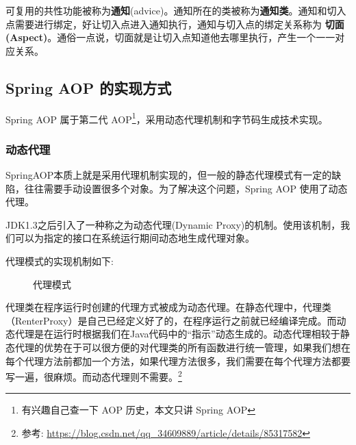 可复用的共性功能被称为\textbf{通知}(advice)。通知所在的类被称为\textbf{通知类}。通知和切入点需要进行绑定，好让切入点进入通知执行，通知与切入点的绑定关系称为 \textbf{切面(Aspect)}。通俗一点说，切面就是让切入点知道他去哪里执行，产生一个一一对应关系。

\subsection{Spring AOP 的实现方式}

Spring AOP 属于第二代 AOP\footnote{有兴趣自己查一下 AOP 历史，本文只讲 Spring AOP}，采用动态代理机制和字节码生成技术实现。

\subsubsection{动态代理}

SpringAOP本质上就是采用代理机制实现的，但一般的静态代理模式有一定的缺陷，往往需要手动设置很多个对象。为了解决这个问题，Spring AOP 使用了动态代理。

JDK1.3之后引入了一种称之为动态代理(Dynamic Proxy)的机制。使用该机制，我们可以为指定的接口在系统运行期间动态地生成代理对象。

代理模式的实现机制如下:

\begin{figure}[H]
    \scriptsize
    \centering
    \caption{代理模式}
    \label{fig:代理模式}
\end{figure}

代理类在程序运行时创建的代理方式被成为动态代理。在静态代理中，代理类（RenterProxy）是自己已经定义好了的，在程序运行之前就已经编译完成。而动态代理是在运行时根据我们在Java代码中的“指示”动态生成的。动态代理相较于静态代理的优势在于可以很方便的对代理类的所有函数进行统一管理，如果我们想在每个代理方法前都加一个方法，如果代理方法很多，我们需要在每个代理方法都要写一遍，很麻烦。而动态代理则不需要。\footnote{参考: \url{https://blog.csdn.net/qq_34609889/article/details/85317582}}

